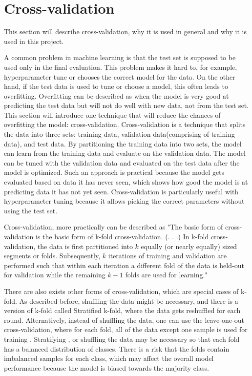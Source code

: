 \section{Cross-validation}\label{sec:cross-validation}

This section will describe cross-validation, why it is used in general and why it is used in this project.

A common problem in machine learning is that the test set is supposed to be used only in the final evaluation. This problem makes it hard to, for example, hyperparameter tune or chooses the correct model for the data. On the other hand, if the test data is used to tune or choose a model, this often leads to overfitting.
Overfitting can be described as when the model is very good at predicting the test data but will not do well with new data, not from the test set. This section will introduce one technique that will reduce the chances of overfitting the model: cross-validation. Cross-validation is a technique that splits the data into three sets: training data, validation data(comprising of training data), and test data. By partitioning the training data into two sets, the model can learn from the training data and evaluate on the validation data. The model can be tuned with the validation data and evaluated on the test data after the model is optimized. Such an approach is practical because the model gets evaluated based on data it has never seen, which shows how good the model is at predicting data it has not yet seen\cite{scikit-learn}. Cross-validation is particularly useful with hyperparameter tuning because it allows picking the correct parameters without using the test set. 


Cross-validation, more practically can be described as
"The basic form of cross-validation is the basic form of k-fold cross-validation. (. . .) In k-fold cross-validation, the data is first partitioned into $k$ equally (or nearly equally) sized segments or folds. Subsequently, $k$ iterations of training and validation are performed such that within each iteration a different fold of the data is held-out for validation while the remaining $k-1$ folds are used for learning." \cite{Refaeilzadeh2009}

There are also exists other forms of cross-validation, which are special cases of k-fold. As described before, shuffling the data might be necessary, and there is a version of k-fold called Stratified k-fold, where the data gets reshuffled for each round. Alternatively, instead of shuffling the data, one can use the leave-one-out cross-validation, where for each fold, all of the data except one sample is used for training \cite{Refaeilzadeh2009}. Stratifying \cite{Refaeilzadeh2009}, or shuffling the data may be necessary so that each fold has a balanced distribution of classes. There is a risk that the folds contain imbalanced samples for each class, which may affect the overall model performance because the model is biased towards the majority class.

